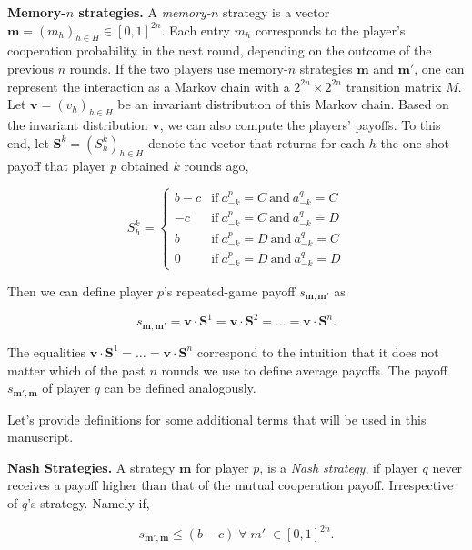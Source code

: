 \documentclass{article}
\theoremstyle{definition}
\begin{document}
{\bf Memory-$n$ strategies.} A {\it memory-$n$} strategy is a vector
$\mathbf{m}=(m_h)_{h\in H}\in[0,1]^{2n}$. Each entry $m_h$ corresponds to the
player's cooperation probability in the next round, depending on the outcome of
the previous $n$ rounds. If the two players use memory-$n$ strategies
$\mathbf{m}$ and $\mathbf{m'}$, one can represent the interaction as a Markov
chain with a $2^{2n}\!\times\!2^{2n}$ transition matrix $M$. Let
$\mathbf{v}=(v_h)_{h\in H}$ be an invariant distribution of this Markov chain.
Based on the invariant distribution $\mathbf{v}$, we can also compute the
players' payoffs. To this end, let $\mathbf{S}^k = (S_h^k)_{h\in H}$ denote the
vector that returns for each $h$ the one-shot payoff that player $p$ obtained
$k$ rounds ago,

\begin{equation}
    S_h^k = \left\{
    \begin{array}{cl}
    b-c	&\text{if}~ a_{-k}^p=C~\text{and}~ a_{-k}^q=C\\
    -c	&\text{if}~ a_{-k}^p=C~\text{and}~ a_{-k}^q=D\\
    b	&\text{if}~ a_{-k}^p=D~\text{and}~ a_{-k}^q=C\\
    0	&\text{if}~ a_{-k}^p=D~\text{and}~ a_{-k}^q=D
    \end{array}
    \right.
\end{equation}

Then we can define player $p$'s repeated-game payoff $s_{\mathbf{m},\mathbf{m'}}$ as

\begin{equation} \label{Eq:Payoff}
s_{\mathbf{m},\mathbf{m'}}  = \mathbf{v}\cdot \mathbf{S}^1 = \mathbf{v}\cdot \mathbf{S}^2 = \ldots = \mathbf{v} \cdot \mathbf{S}^n.
\end{equation}

The equalities $\mathbf{v}\cdot \mathbf{S}^1 = \ldots = \mathbf{v} \cdot
\mathbf{S}^n$ correspond to the intuition that it does not matter which of the
past $n$ rounds we use to define average payoffs. The payoff
$s_{\mathbf{m'},\mathbf{m}}$ of player $q$ can be defined analogously.

Let's provide definitions for some additional terms that will be used in this
manuscript.

{\bf Nash Strategies.} A strategy $\mathbf{m}$ for player $p$, is a \textit{Nash
strategy}, if player $q$ never receives a payoff higher than that of the mutual
cooperation payoff. Irrespective of $q$'s strategy. Namely if,

\begin{equation}\label{Eq:Nash}
    s_{\mathbf{m'},\mathbf{m}} \leq (b - c) \; \forall \; m' \; \in [0, 1]^{2n}.
\end{equation}
\end{document}
